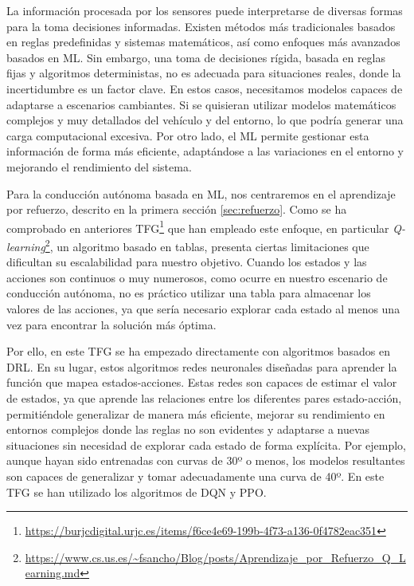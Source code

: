 La información procesada por los sensores puede interpretarse de diversas formas para la toma decisiones informadas. Existen métodos más tradicionales basados en reglas predefinidas y sistemas matemáticos, así como enfoques más avanzados basados en \ac{ML}. Sin embargo, una toma de decisiones rígida, basada en reglas fijas y algoritmos deterministas, no es adecuada para situaciones reales, donde la incertidumbre es un factor clave. En estos casos, necesitamos modelos capaces de adaptarse a escenarios cambiantes. Si se quisieran utilizar modelos matemáticos complejos y muy detallados del vehículo y del entorno, lo que podría generar una carga computacional excesiva. Por otro lado, el \ac{ML} permite gestionar esta información de forma más eficiente, adaptándose a las variaciones en el entorno y mejorando el rendimiento del sistema.

Para la conducción autónoma basada en \ac{ML}, nos centraremos en el aprendizaje por refuerzo, descrito en la primera sección \ref{sec:refuerzo}. Como se ha comprobado en anteriores \ac{TFG}\footnote{\url{https://burjcdigital.urjc.es/items/f6ce4e69-199b-4f73-a136-0f4782eac351}} que han empleado este enfoque, en particular \textit{Q-learning}\footnote{\url{https://www.cs.us.es/~fsancho/Blog/posts/Aprendizaje_por_Refuerzo_Q_Learning.md}}, un algoritmo basado en tablas, presenta ciertas limitaciones que dificultan su escalabilidad para nuestro objetivo. Cuando los estados y las acciones son continuos o muy numerosos, como ocurre en nuestro escenario de conducción autónoma, no es práctico utilizar una tabla para almacenar los valores de las acciones, ya que sería necesario explorar cada estado al menos una vez para encontrar la solución más óptima. 

Por ello, en este \ac{TFG} se ha empezado directamente con algoritmos basados en \ac{DRL}. En su lugar, estos algoritmos redes neuronales diseñadas para aprender la función que mapea estados-acciones. Estas redes son capaces de estimar el valor de estados, ya que aprende las relaciones entre los diferentes pares estado-acción, permitiéndole generalizar de manera más eficiente, mejorar su rendimiento en entornos complejos donde las reglas no son evidentes y adaptarse a nuevas situaciones sin necesidad de explorar cada estado de forma explícita. Por ejemplo, aunque hayan sido entrenadas con curvas de 30º o menos, los modelos resultantes son capaces de generalizar y tomar adecuadamente una curva de 40º. En este \ac{TFG} se han utilizado los algoritmos de \ac{DQN} y \ac{PPO}. 

